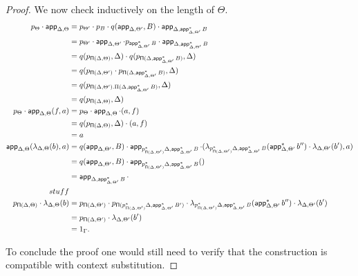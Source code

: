 \begin{proof}
  We now check inductively on the length of $\Theta$.
  \begin{align*}
    p_{\Theta}\cdot\app_{\Delta,\Theta}
    &=p_{\Theta'}\cdot
    p_B\cdot
    q(\app_{\Delta,\Theta'},B)\cdot
    \app_{\Delta,\app^*_{\Delta,\Theta'}B} \\
    &=p_{\Theta'}\cdot
    \app_{\Delta,\Theta'}\cdot
    p_{\app^*_{\Delta,\Theta'}B}\cdot
    \app_{\Delta,\app^*_{\Delta,\Theta'}B} \\
    &=q(p_{\Pis(\Delta,\Theta)},\Delta)\cdot
    q(p_{\Pis(\Delta,\app^*_{\Delta,\Theta'}B)},\Delta) \\
    &=q(p_{\Pis(\Delta,\Theta')}\cdot
    p_{\Pis(\Delta,\app^*_{\Delta,\Theta'}B)},\Delta) \\
    &=q(p_{\Pis(\Delta,\Theta').\Pi(\Delta,\app^*_{\Delta,\Theta'}B)},\Delta) \\
    &=q(p_{\Pis(\Delta,\Theta)},\Delta) \\
    p_\Theta\cdot\app_{\Delta,\Theta}(f,a)
    &=p_\Theta\cdot\app_{\Delta,\Theta}\cdot(a,f) \\
    &=q(p_{\Pis(\Delta,\Theta)},\Delta)\cdot(a,f) \\
    &=a \\
    \app_{\Delta,\Theta}(\lambda_{\Delta,\Theta}(b),a)
    &=q(\app_{\Delta,\Theta'},B)\cdot
    \app_{p^*_{\Pis(\Delta,\Theta')}\Delta,\app^*_{\Delta,\Theta'}B}\cdot
    (\lambda_{p^*_{\Pis(\Delta,\Theta')}\Delta,\app^*_{\Delta,\Theta'}B}(\app_{\Delta,\Theta'}^*b'')\cdot\lambda_{\Delta,\Theta'}(b'),a) \\
    &=q(\app_{\Delta,\Theta'},B)\cdot
    \app_{p^*_{\Pis(\Delta,\Theta')}\Delta,\app^*_{\Delta,\Theta'}B}
    () \\
    &=\app_{\Delta,\app^*_{\Delta,\Theta'}B}\cdot \\
    stuff \\
    p_{\Pis(\Delta,\Theta)}\cdot
    \lambda_{\Delta,\Theta}(b)
    &=p_{\Pis(\Delta,\Theta')}\cdot
    p_{\Pis(p_{\Pi(\Delta,\Theta')}^*\Delta,\app^*_{\Delta,\Theta'}B')}\cdot
    \lambda_{p^*_{\Pis(\Delta,\Theta')}\Delta,\app^*_{\Delta,\Theta'}B}(\app_{\Delta,\Theta'}^*b'')\cdot
    \lambda_{\Delta,\Theta'}(b') \\
    &=p_{\Pis(\Delta,\Theta')}\cdot
    \lambda_{\Delta,\Theta'}(b') \\
    &=1_\Gamma.
  \end{align*}

  To conclude the proof one would still need to verify that the construction is
  compatible with context substitution.
\end{proof}


